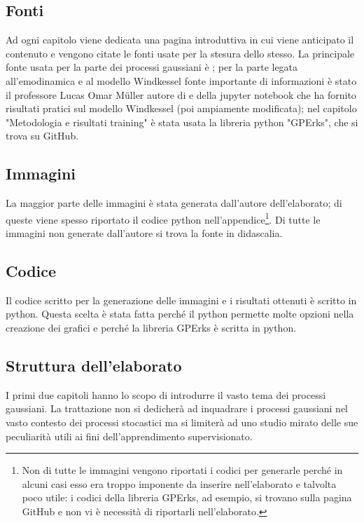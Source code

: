 \subsection{Fonti}
Ad ogni capitolo viene dedicata una pagina introduttiva in cui viene anticipato il contenuto e vengono citate le fonti usate per la stesura dello stesso.
La principale fonte usata per la parte dei processi gaussiani è \cite{rasmussen_gaussian_2006}; per la parte legata all'emodinamica e al modello Windkessel fonte importante di informazioni è stato il professore Lucas Omar Müller autore di \cite{ghitti_toro_müller_2022} e della jupyter notebook che ha fornito risultati pratici sul modello Windkessel (poi ampiamente modificata); nel capitolo "Metodologia e risultati training" è stata usata la libreria python "GPErks", che si trova su GitHub.

\subsection{Immagini}
La maggior parte delle immagini è stata generata dall'autore dell'elaborato; di queste viene spesso riportato il codice python nell'appendice\footnote{Non di tutte le immagini vengono riportati i codici per generarle perché in alcuni casi esso era troppo imponente da inserire nell'elaborato e talvolta poco utile: i codici della libreria GPErks, ad esempio, si trovano sulla pagina GitHub e non vi è necessità di riportarli nell'elaborato.}. Di tutte le immagini non generate dall'autore si trova la fonte in didascalia.

\subsection{Codice}
Il codice scritto per la generazione delle immagini e i risultati ottenuti è scritto in python. Questa scelta è stata fatta perché il python permette molte opzioni nella creazione dei grafici e perché la libreria GPErks è scritta in python.

\newpage

\subsection{Struttura dell'elaborato}
I primi due capitoli hanno lo scopo di introdurre il vasto tema dei processi gaussiani. La trattazione non si dedicherà ad inquadrare i processi gaussiani nel vasto contesto dei processi stocastici ma si limiterà ad uno studio mirato delle sue peculiarità utili ai fini dell'apprendimento supervisionato.\\

